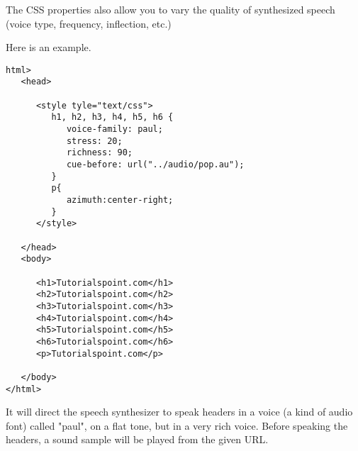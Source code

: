 \documentclass[a4paper,oneside]{book}
\numberwithin{equation}{chapter}
\begin{document}
The CSS properties also allow you to vary the quality of synthesized speech (voice type, frequency, inflection, etc.)

Here is an example.
\begin{verbatim}
html>
   <head>
   
      <style tyle="text/css">
         h1, h2, h3, h4, h5, h6 {
            voice-family: paul;
            stress: 20;
            richness: 90;
            cue-before: url("../audio/pop.au");
         }
         p{
            azimuth:center-right;
         }
      </style>
      
   </head>
   <body>
   
      <h1>Tutorialspoint.com</h1>
      <h2>Tutorialspoint.com</h2>
      <h3>Tutorialspoint.com</h3>
      <h4>Tutorialspoint.com</h4>
      <h5>Tutorialspoint.com</h5>
      <h6>Tutorialspoint.com</h6>
      <p>Tutorialspoint.com</p>
      
   </body>
</html> 
\end{verbatim}
It will direct the speech synthesizer to speak headers in a voice (a kind of audio font) called "paul", on a flat tone, but in a very rich voice. Before speaking the headers, a sound sample will be played from the given URL.
\end{document}
